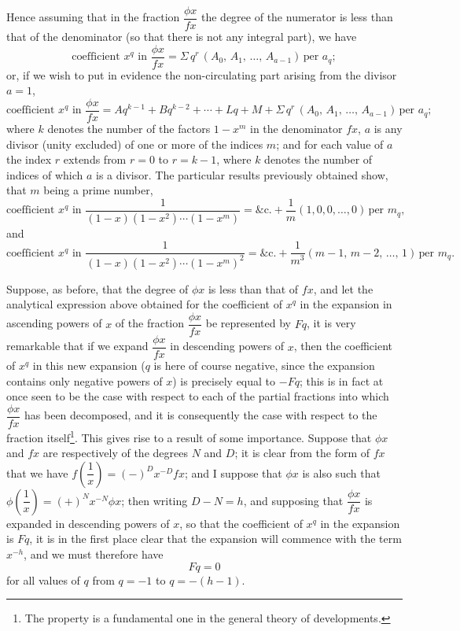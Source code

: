 \documentclass[11pt]{article}
\begin{document}
Hence assuming that in the fraction $\dfrac{\phi x}{f x}$ the degree of the numerator is less than that of the denominator (so that there is not any integral part), we have
\[
\text{coefficient } x^q \text{ in } \frac{\phi x}{f x} = \Sigma\,q^r\,(A_0,\, A_1,\, \ldots,\, A_{a-1})\,\text{per }a_q;
\]
or, if we wish to put in evidence the non-circulating part arising from the divisor $a=1$,
\[
\text{coefficient } x^q \text{ in } \frac{\phi x}{f x} = A q^{k-1} + B q^{k-2} + \cdots + L q + M + \Sigma\,q^r\,(A_0,\, A_1,\, \ldots,\, A_{a-1})\,\text{per }a_q;
\]
where $k$ denotes the number of the factors $1-x^m$ in the denominator $f x$, $a$ is any divisor (unity excluded) of one or more of the indices $m$; and for each value of $a$ the index $r$ extends from $r=0$ to $r=k-1$, where $k$ denotes the number of indices of which $a$ is a divisor. The particular results previously obtained show, that $m$ being a prime number,
\[
\text{coefficient } x^q \text{ in } \frac{1}{(1-x)(1-x^2)\cdots(1-x^m)} = \&\text{c.} + \frac{1}{m}(1, 0, 0, \ldots, 0)\,\text{per }m_q,
\]
and
\[
\text{coefficient } x^q \text{ in } \frac{1}{(1-x)(1-x^2)\cdots(1-x^m)^2} = \&\text{c.} + \frac{1}{m^3}(m-1,\, m-2,\, \ldots,\, 1)\,\text{per }m_q.
\]

Suppose, as before, that the degree of $\phi x$ is less than that of $f x$, and let the analytical expression above obtained for the coefficient of $x^q$ in the expansion in ascending powers of $x$ of the fraction $\dfrac{\phi x}{f x}$ be represented by $F q$, it is very remarkable that if we expand $\dfrac{\phi x}{f x}$ in descending powers of $x$, then the coefficient of $x^q$ in this new expansion ($q$ is here of course negative, since the expansion contains only negative powers of $x$) is precisely equal to $-F q$; this is in fact at once seen to be the case with respect to each of the partial fractions into which $\dfrac{\phi x}{f x}$ has been decomposed, and it is consequently the case with respect to the fraction itself\footnote{The property is a fundamental one in the general theory of developments.}. This gives rise to a result of some importance. Suppose that $\phi x$ and $f x$ are respectively of the degrees $N$ and $D$; it is clear from the form of $f x$ that we have $f\!\left(\dfrac{1}{x}\right) = (-)^D x^{-D} f x$; and I suppose that $\phi x$ is also such that $\phi\!\left(\dfrac{1}{x}\right) = (+)^N x^{-N} \phi x$; then writing $D - N = h$, and supposing that $\dfrac{\phi x}{f x}$ is expanded in descending powers of $x$, so that the coefficient of $x^q$ in the expansion is $F q$, it is in the first place clear that the expansion will commence with the term $x^{-h}$, and we must therefore have
\[
F q = 0
\]
for all values of $q$ from $q = -1$ to $q = -(h-1)$.
\end{document}
